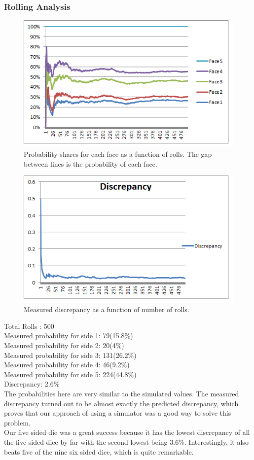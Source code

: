 \subsubsection{Rolling Analysis}
\begin{figure}[h]
\center
\includegraphics[scale=1]{pyramid5_graph.png}
\caption{Probability shares for each face as a function of rolls. The gap between lines is the probability of each face.}
\label{fig:pyr5g}
\end{figure}
\begin{figure}[h]
\center
\includegraphics[scale=1]{pyramid5_d.png}
\caption{Measured discrepancy as a function of number of rolls.}
\label{fig:pyr5d}
\end{figure}
Total Rolls : 500\\
Measured probability for side 1: 79(15.8\%)\\
Measured probability for side 2: 20(4\%)\\
Measured probability for side 3: 131(26.2\%)\\
Measured probability for side 4: 46(9.2\%)\\
Measured probability for side 5: 224(44.8\%)\\
Discrepancy: 2.6\%\\
The probabilities here are very similar to the simulated values. The measured discrepancy turned out to be almost exactly the predicted discrepancy, which proves that our approach of using a simulator was a good way to solve this problem.\\
Our five sided die was a great success because it has the lowest discrepancy of all the five sided dice by far with the second lowest being 3.6\%. Interestingly, it also beats five of the nine six sided dice, which is quite remarkable.\\

